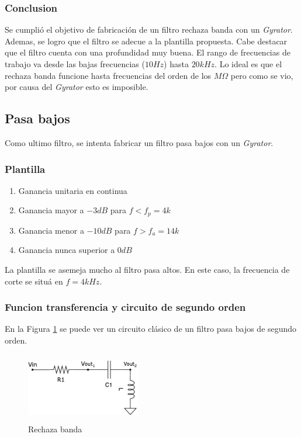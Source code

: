 \subsubsection{Conclusion}

Se cumplió el objetivo de fabricación de un filtro rechaza banda con un \textit{Gyrator}. Ademas, se logro que el filtro se adecue a la plantilla propuesta. Cabe destacar que el filtro cuenta con una profundidad muy buena. El rango de frecuencias de trabajo va desde las bajas frecuencias ($10Hz$) hasta $20kHz$. Lo ideal es que el rechaza banda funcione hasta frecuencias del orden de los $M\Omega$ pero como se vio, por causa del \textit{Gyrator} esto es imposible. 




\subsection{Pasa bajos}

Como ultimo filtro, se intenta fabricar un filtro pasa bajos con un \textit{Gyrator}.


\subsubsection{Plantilla}

\begin{enumerate}
	\item Ganancia unitaria en continua
	\item Ganancia mayor a $-3dB$ para $f<f_p = 4k$
	\item Ganancia menor a $-10dB$ para $f>f_a = 14k$
	\item Ganancia nunca superior a $0dB$
\end{enumerate}

La plantilla se asemeja mucho al filtro pasa altos. En este caso, la frecuencia de corte se situá en $f=4kHz$.

\subsubsection{Funcion transferencia y circuito de segundo orden}

En la Figura \ref{ej2_filto_LP} se puede ver un circuito clásico de un filtro pasa bajos de segundo orden. 

\begin{figure}[h!]                                                       
\centering\includegraphics[width=5cm, height=3cm]{../Ex2/Resources/ej2_lp.png}
\caption{Rechaza banda}
\label{ej2_filto_LP}
\end{figure}


